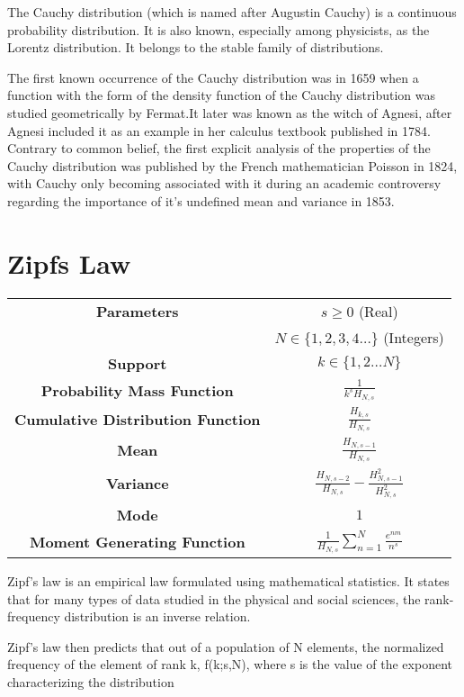 \documentclass[14pt, a4paper]{article}
\theoremstyle{definition}
\begin{document}
The Cauchy distribution (which is named after Augustin Cauchy) is a continuous probability distribution. It is also known, especially among physicists, as the Lorentz distribution. It belongs to the stable family of distributions.

The first known occurrence of the Cauchy distribution was in 1659 when a function with the form of the density function of the Cauchy distribution was studied geometrically by Fermat.It later was known as the witch of Agnesi, after Agnesi included it as an example in her calculus textbook published in 1784. Contrary to common belief, the first explicit analysis of the properties of the Cauchy distribution was published by the French mathematician Poisson in 1824, with Cauchy only becoming associated with it during an academic controversy regarding the importance of it's undefined mean and variance in 1853.
  
  
\section{Zipfs Law}
\begin{tabular}{|c|c|}  %
\hline
 \textbf{Parameters }& $s \geq 0$ (Real) \\ & $N \in \{ 1,2,3,4 \dots \}$ (Integers) \\
 \hline
 \textbf{Support} & $k \in \{ 1,2 \dots N \} $ \\
 \hline
 \textbf{Probability Mass Function} & 
 $ \frac{1}{k^s H_{N,s}}$
 \\
 \hline
 \textbf{Cumulative Distribution Function} &  $\frac{H_{k,s}}{H_{N,s}}$ \\
 \hline
 \textbf{Mean} & $\frac{H_{N,s-1}}{H_{N,s}}$ \\ 
 \hline
 \textbf{Variance} & $\frac{H_{N,s-2}}{H_{N,s}} - \frac{H^2_{N,s-1}}{H^2_{N,s}}$ \\
 \hline
 \textbf{Mode} & $1$ \\
 \hline
 \textbf{Moment Generating Function} & $\frac{1}{H_{N,s}} \sum^N_{n=1}\frac{e^{nm}}{n^s}$ \\
 \hline

  \end{tabular}
  
  
Zipf's law is an empirical law formulated using mathematical statistics. It states that for many types of data studied in the physical and social sciences, the rank-frequency distribution is an inverse relation.

Zipf's law then predicts that out of a population of N elements, the normalized frequency of the element of rank k, f(k;s,N), where s is  the value of the exponent characterizing the distribution
\end{document}
